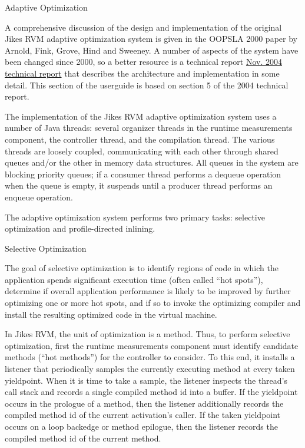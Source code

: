 \begin{section}{Adaptive Optimization}
\label{sec:adaptiveoptimization}

A comprehensive discussion of the design and implementation of the original Jikes RVM adaptive optimization system is given in the OOPSLA 2000 paper by Arnold, Fink, Grove, Hind and Sweeney. A number of aspects of the system have been changed since 2000, so a better resource is a technical report \href{http://domino.research.ibm.com/library/cyberdig.nsf/1e4115aea78b6e7c85256b360066f0d4/30c2b5bb5352443885256f550066b5c1%21OpenDocument}{Nov. 2004 technical report} that describes the architecture and implementation in some detail. This section of the userguide is based on section 5 of the 2004 technical report.

The implementation of the Jikes RVM adaptive optimization system uses a number of Java threads: several organizer threads in the runtime measurements component, the controller thread, and the compilation thread. The various threads are loosely coupled, communicating with each other through shared queues and/or the other in memory data structures. All queues in the system are blocking priority queues; if a consumer thread performs a dequeue operation when the queue is empty, it suspends until a producer thread performs an enqueue operation.

The adaptive optimization system performs two primary tasks: selective optimization and profile-directed inlining.

\begin{subsection}{Selective Optimization}

The goal of selective optimization is to identify regions of code in which the application spends significant execution time (often called ``hot spots''), determine if overall application performance is likely to be improved by further optimizing one or more hot spots, and if so to invoke the optimizing compiler and install the resulting optimized code in the virtual machine.

In Jikes RVM, the unit of optimization is a method.  Thus, to perform selective optimization, first the runtime measurements component must identify candidate methods (``hot methods'') for the controller to consider. To this end, it installs a listener that periodically samples the currently executing method at every taken yieldpoint.  When it is time to take a sample, the listener inspects the thread's call stack and records a single compiled method id into a buffer. If the yieldpoint occurs in the prologue of a method, then the listener additionally records the compiled method id of the current activation's caller.  If the taken yieldpoint occurs on a loop backedge or method epilogue, then the listener records the compiled method id of the current method. 


\end{subsection}
\end{section}
